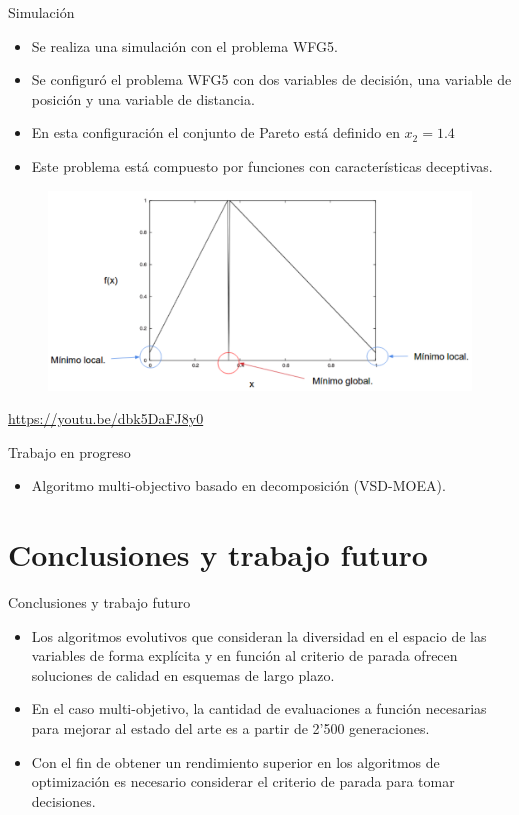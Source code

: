 \documentclass{beamer}
\newcommand{\HV}{{\sc hv}}
\begin{document}
\begin{frame}{Simulación}
\begin{itemize}
\scriptsize
\justifying
\item Se realiza una simulación con el problema WFG5.
\item Se configuró el problema WFG5 con dos variables de decisión, una variable de posición y una variable de distancia.
\item En esta configuración el conjunto de Pareto está definido en $x_2 = 1.4$
\item Este problema está compuesto por funciones con características deceptivas.
\end{itemize}
\begin{figure}[t]
\centering
\includegraphics[scale=0.2]{deceptiva_wfg5.png} \\
\end{figure}
\centering
\url{https://youtu.be/dbk5DaFJ8y0}
\end{frame}

\begin{frame}{Trabajo en progreso}
\begin{itemize}
    \item Algoritmo multi-objectivo basado en decomposición (VSD-MOEA).
\end{itemize}
\end{frame}


\section{Conclusiones y trabajo futuro}
\begin{frame}{Conclusiones y trabajo futuro}
    \begin{itemize}
        \item Los algoritmos evolutivos que consideran la diversidad en el espacio de las variables de forma explícita y en función al criterio de parada ofrecen soluciones de calidad en esquemas de largo plazo. 
        \item En el caso multi-objetivo, la cantidad de evaluaciones a función necesarias para mejorar al estado del arte es a partir de 2'500 generaciones.
        \item Con el fin de obtener un rendimiento superior en los algoritmos de optimización es necesario considerar el criterio de parada para tomar decisiones.
    \end{itemize}
\end{frame}




\end{document}
